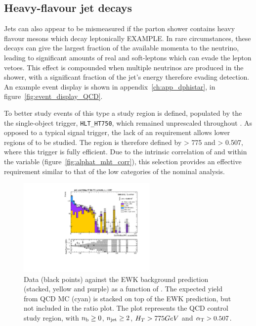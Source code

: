\subsection{Heavy-flavour jet decays}

Jets can also appear to be mismeasured if the parton
shower contains heavy flavour mesons which decay leptonically EXAMPLE. In rare
circumstances, these decays can give the largest fraction of the available
momenta to the neutrino, leading to significant amounts of real \met and
soft-leptons which can evade the lepton vetoes.
This effect is compounded when multiple neutrinos are produced in the shower,
with a significant fraction of the jet's energy therefore evading detection. An
example event display is shown in appendix~\ref{ch:app_dphistar}, in
figure~\ref{fig:event_display_QCD}.

To better study events of this type a study region is defined, populated by the
the single-object \HT trigger, \verb!HLT_HT750!, which remained unprescaled
throughout \runone. As opposed to a typical signal trigger, the lack of an
\alphat requirement allows lower regions of \alphat to be studied. The region is
therefore defined by \HT > 775 \gev and \alphat > 0.507, where this trigger is
fully efficient. Due to the intrinsic correlation of \HT and \mht within the
\alphat variable (figure~\ref{fig:alphat_mht_corr}), this selection provides
an effective \mht requirement similar to that of the low \HT categories of the
nominal analysis.

\begin{figure}[b!]
  \centering
  \includegraphics[width=0.6\textwidth]
  {Figs/datapred/qcd_study_region/ge2j_ge0b_775_upwards/Prediction_ComMinBiasDPhi_acceptedJets_all_775_upwards_QCD}
  \caption{Data (black points) against the EWK background prediction 
  (stacked, yellow and purple) as a function of \mindphistar. The expected yield
  from QCD MC (cyan) is stacked on top of the EWK prediction, but not included
  in the ratio plot. The plot represents
  the QCD control study region, with $n_{\text{b}} \geq 0$, $n_{\text{jet}} \geq 2$, $H_T > 775
  GeV$ and $\alpha_{\text{T}} > 0.507$.}
  \label{fig:qcd_region_pred_dphistar_incl}
\end{figure}

